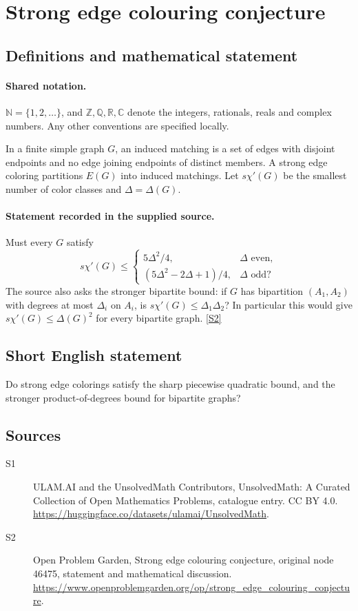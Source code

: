 \documentclass[11pt]{article}
\newcommand{\sref}[2]{\hyperlink{source:#1:#2}{[S#2]}}
\begin{document}
\section{Strong edge colouring conjecture}\label{statement}

\subsection{Definitions and mathematical statement}

\paragraph{Shared notation.}$\mathbb N=\{1,2,\ldots\}$, and $\mathbb Z,\mathbb Q,\mathbb R,\mathbb C$ denote the integers, rationals, reals and complex numbers. Any other conventions are specified locally.


In a finite simple graph $G$, an induced matching is a set of edges with disjoint endpoints and no edge joining endpoints of distinct members. A strong edge coloring partitions $E(G)$ into induced matchings. Let $s\chi'(G)$ be the smallest number of color classes and $\Delta=\Delta(G)$.
\paragraph{Statement recorded in the supplied source.}
Must every $G$ satisfy \[s\chi'(G)\le\begin{cases}5\Delta^2/4,&\Delta\text{ even},\\(5\Delta^2-2\Delta+1)/4,&\Delta\text{ odd}?\end{cases}\] The source also asks the stronger bipartite bound: if $G$ has bipartition $(A_1,A_2)$ with degrees at most $\Delta_i$ on $A_i$, is $s\chi'(G)\le\Delta_1\Delta_2$? In particular this would give $s\chi'(G)\le\Delta(G)^2$ for every bipartite graph. \sref{statement}{2}
\subsection{Short English statement}
Do strong edge colorings satisfy the sharp piecewise quadratic bound, and the stronger product-of-degrees bound for bipartite graphs?
\subsection{Sources}
\begin{description}
\item[\hypertarget{source:statement:1}{S1}] ULAM.AI and the UnsolvedMath Contributors, UnsolvedMath: A Curated Collection of Open Mathematics Problems, catalogue entry. CC BY 4.0. \url{https://huggingface.co/datasets/ulamai/UnsolvedMath}.
\item[\hypertarget{source:statement:2}{S2}] Open Problem Garden, Strong edge colouring conjecture, original node 46475, statement and mathematical discussion. \url{https://www.openproblemgarden.org/op/strong_edge_colouring_conjecture}.
\end{description}
\label{end:statement}
\end{document}
